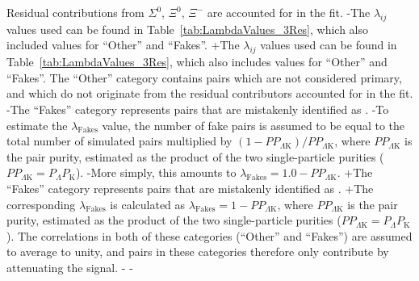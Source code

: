  
 Residual contributions from $\Sigma^{0}$, $\Xi^{0}$, $\Xi^{-}$ are accounted for in the fit.
-The $\lambda_{ij}$ values used can be found in Table~\ref{tab:LambdaValues_3Res}, which also included values for ``Other'' and ``Fakes''.  
+The $\lambda_{ij}$ values used can be found in Table~\ref{tab:LambdaValues_3Res}, which also includes values for ``Other'' and ``Fakes''.  
 The ``Other'' category contains pairs which are not considered primary, and which do not originate from the residual contributors accounted for in the fit.  
-The ``Fakes'' category represents pairs that are mistakenly identified as \LamK.  
-To estimate the $\lambda_{\mathrm{Fakes}}$ value, the number of fake pairs is assumed to be equal to the total number of simulated pairs multiplied by $(1-PP_{\Lambda\mathrm{K}})/PP_{\Lambda\mathrm{K}}$, where $PP_{\Lambda\mathrm{K}}$ is the \LamK pair purity, estimated as the product of the two single-particle purities ($PP_{\Lambda\mathrm{K}} = P_{\Lambda}P_{\mathrm{K}}$).
-More simply, this amounts to $\lambda_{\mathrm{Fakes}} = 1.0-PP_{\Lambda\mathrm{K}}$.
+The ``Fakes'' category represents pairs that are mistakenly identified as \LamK.
+The corresponding $\lambda_{\mathrm{Fakes}}$ is calculated as $\lambda_{\mathrm{Fakes}} = 1-PP_{\Lambda\mathrm{K}}$, where $PP_{\Lambda\mathrm{K}}$ is the \LamK pair purity, estimated as the product of the two single-particle purities ($PP_{\Lambda\mathrm{K}} = P_{\Lambda}P_{\mathrm{K}}$).
 The correlations in both of these categories (``Other'' and ``Fakes'') are assumed to average to unity, and pairs in these categories therefore only contribute by attenuating the signal. 
-
-%
